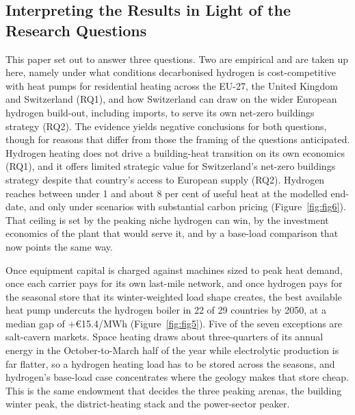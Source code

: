 \label{sec:discussion}


\subsection{Interpreting the Results in Light of the Research Questions}

This paper set out to answer three questions. Two are empirical and are taken up
here, namely under what conditions decarbonised
hydrogen is cost-competitive with heat pumps for residential heating across the
EU-27, the United Kingdom and Switzerland (RQ1), and how Switzerland can draw on
the wider European hydrogen build-out, including imports, to serve its own
net-zero buildings strategy (RQ2). The evidence yields negative conclusions for
both questions, though for reasons that differ from those the framing of the
questions anticipated. Hydrogen heating does not drive a building-heat transition
on its own economics (RQ1), and it offers limited strategic value for
Switzerland's net-zero buildings strategy despite that country's access to
European supply (RQ2). Hydrogen reaches between under 1 and about 8 per cent of useful heat at
the modelled end-date, and only under scenarios with substantial carbon pricing
(Figure~\ref{fig:fig6}). That ceiling is set by the peaking niche hydrogen can
win, by the investment economics of the plant that would serve it, and by a
base-load comparison that now points the same way.

Once equipment capital is
charged against machines sized to peak heat demand, once each carrier pays for
its own last-mile network, and once hydrogen pays for the seasonal store that
its winter-weighted load shape creates, the best available heat pump undercuts
the hydrogen boiler in 22 of 29 countries by 2050, at a median gap of
$+$\euro{}15.4/MWh (Figure~\ref{fig:fig5}). Five of the seven exceptions are
salt-cavern markets. Space heating draws about three-quarters of its annual
energy in the October-to-March half of the year while electrolytic production is
far flatter, so a hydrogen heating load has to be stored across the seasons, and
hydrogen's base-load case concentrates where the geology makes that store cheap. This is
the same endowment that decides the three peaking arenas, the building winter peak, the
district-heating stack and the power-sector peaker.

